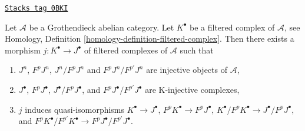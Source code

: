 \begin{lemma}
\label{injectives-lemma-K-injective-embedding-filtration}
\href{https://stacks.math.columbia.edu/tag/0BKI}{\texttt{Stacks tag 0BKI}}

Let $\mathcal{A}$ be a Grothendieck abelian category.
Let $K^\bullet$ be a filtered complex of $\mathcal{A}$, see
Homology, Definition \ref{homology-definition-filtered-complex}.
Then there exists a morphism $j : K^\bullet \to J^\bullet$
of filtered complexes of $\mathcal{A}$ such that
\begin{enumerate}
\item $J^n$, $F^pJ^n$, $J^n/F^pJ^n$ and $F^pJ^n/F^{p'}J^n$ are injective
objects of $\mathcal{A}$,
\item $J^\bullet$, $F^pJ^\bullet$, $J^\bullet/F^pJ^\bullet$, and
$F^pJ^\bullet/F^{p'}J^\bullet$ are K-injective complexes,
\item $j$ induces quasi-isomorphisms
$K^\bullet \to J^\bullet$,
$F^pK^\bullet \to F^pJ^\bullet$,
$K^\bullet/F^pK^\bullet \to J^\bullet/F^pJ^\bullet$, and
$F^pK^\bullet/F^{p'}K^\bullet \to F^pJ^\bullet/F^{p'}J^\bullet$.
\end{enumerate}
\end{lemma}

